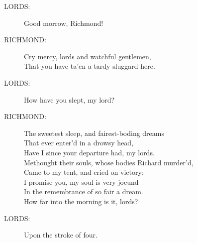 \documentclass{article}
\begin{document}
\begin{description}
\item[LORDS:] 
\hspace{1pt}Good morrow, Richmond!\\
\end{description}
\begin{description}
\item[RICHMOND:] 
\hspace{1pt}Cry mercy, lords and watchful gentlemen,\\
\hspace{1pt}That you have ta'en a tardy sluggard here.\\
\end{description}
\begin{description}
\item[LORDS:] 
\hspace{1pt}How have you slept, my lord?\\
\end{description}
\begin{description}
\item[RICHMOND:] 
\hspace{1pt}The sweetest sleep, and fairest-boding dreams\\
\hspace{1pt}That ever enter'd in a drowsy head,\\
\hspace{1pt}Have I since your departure had, my lords.\\
\hspace{1pt}Methought their souls, whose bodies Richard murder'd,\\
\hspace{1pt}Came to my tent, and cried on victory:\\
\hspace{1pt}I promise you, my soul is very jocund\\
\hspace{1pt}In the remembrance of so fair a dream.\\
\hspace{1pt}How far into the morning is it, lords?\\
\end{description}
\begin{description}
\item[LORDS:] 
\hspace{1pt}Upon the stroke of four.\\
\end{description}
\end{document}
